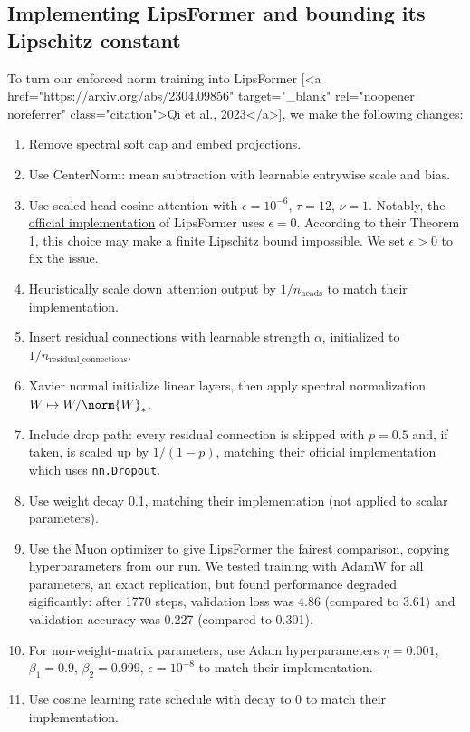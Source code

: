 \subsection{Implementing LipsFormer and bounding its Lipschitz constant}

To turn our enforced norm training into LipsFormer [<a href="https://arxiv.org/abs/2304.09856" target="_blank" rel="noopener noreferrer" class="citation">Qi et al., 2023</a>], we make the following changes:

\begin{enumerate}
    \item Remove spectral soft cap and embed projections.
    \item Use CenterNorm: mean subtraction with learnable entrywise scale and bias.
    \item Use scaled-head cosine attention with $\epsilon = 10^{-6}$, $\tau = 12$, $\nu = 1$. Notably, the \href{https://github.com/IDEA-Research/LipsFormer/blob/main/models/lipsformer_swin.py#L205-L206}{official implementation} of LipsFormer uses $\epsilon = 0$. According to their Theorem 1, this choice may make a finite Lipschitz bound impossible. We set $\epsilon > 0$ to fix the issue.
    \item Heuristically scale down attention output by $1/n_\text{heads}$ to match their implementation.
    \item Insert residual connections with learnable strength $\alpha$, initialized to $1/n_\text{residual\_connections}$.
    \item Xavier normal initialize linear layers, then apply spectral normalization $W \mapsto W / \norm{W}_\ast$.
    \item Include drop path: every residual connection is skipped with $p=0.5$ and, if taken, is scaled up by $1/(1-p)$, matching their official implementation which uses \verb|nn.Dropout|.
    \item Use weight decay 0.1, matching their implementation (not applied to scalar parameters).
    \item Use the Muon optimizer to give LipsFormer the fairest comparison, copying hyperparameters from our run. We tested training with AdamW for all parameters, an exact replication, but found performance degraded sigificantly: after 1770 steps, validation loss was 4.86 (compared to 3.61) and validation accuracy was 0.227 (compared to 0.301).
    \item For non-weight-matrix parameters, use Adam hyperparameters $\eta = 0.001$, $\beta_1 = 0.9$, $\beta_2 = 0.999$, $\epsilon = 10^{-8}$ to match their implementation.
    \item Use cosine learning rate schedule with decay to 0 to match their implementation.
\end{enumerate}

